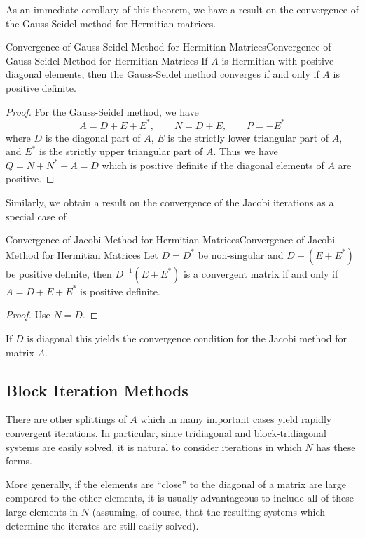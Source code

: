 \documentclass[../main.tex]{subfiles}
\begin{document}
As an immediate corollary of this theorem, we have a result on the convergence of the Gauss-Seidel method for Hermitian matrices.
\begin{corollary}{Convergence of Gauss-Seidel Method for Hermitian Matrices}{Convergence of Gauss-Seidel Method for Hermitian Matrices}
	If $A$ is Hermitian with positive diagonal elements, then the Gauss-Seidel method converges if and only if $A$ is positive definite.
\end{corollary}
\begin{proof}
	For the Gauss-Seidel method, we have
	\begin{equation*}
		A = D + E + E^*, \qquad N = D + E, \qquad P = - E^*
	\end{equation*}
	where $D$ is the diagonal part of $A$, $E$ is the strictly lower triangular part of $A$, and $E^*$ is the strictly upper triangular part of $A$. Thus we have $Q = N + N^* - A = D$ which is positive definite if the diagonal elements of $A$ are positive.
\end{proof}

Similarly, we obtain a result on the convergence of the Jacobi iterations as a special case of
\begin{corollary}{Convergence of Jacobi Method for Hermitian Matrices}{Convergence of Jacobi Method for Hermitian Matrices}
	Let $D = D^*$ be non-singular and $D - (E + E^*)$ be positive definite, then $D^{-1} (E + E^*)$ is a convergent matrix if and only if $A = D + E + E^*$ is positive definite.
\end{corollary}
\begin{proof}
	Use $N = D$.
\end{proof}
If $D$ is diagonal this yields the convergence condition for the Jacobi method for matrix $A$.

\subsection{Block Iteration Methods}
There are other splittings of $A$ which in many important cases yield rapidly convergent iterations. In particular, since tridiagonal and block-tridiagonal systems are easily solved, it is natural to consider iterations in which $N$ has these forms.

More generally, if the elements are ``close'' to the diagonal of a matrix are large compared to the other elements, it is usually advantageous to include all of these large elements in $N$ (assuming, of course, that the resulting systems which determine the iterates are still easily solved).
\end{document}
